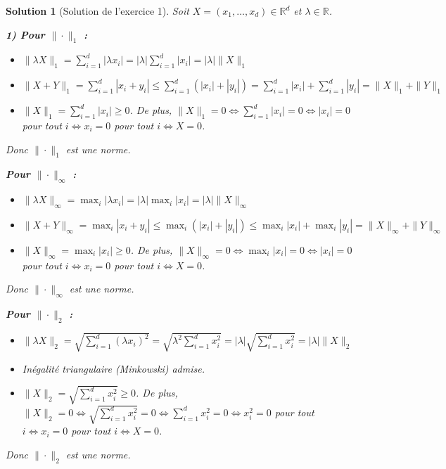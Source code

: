 \documentclass{article}
\newtheorem{solution}{Solution}
\begin{document}
\begin{solution}[Solution de l'exercice 1]
Soit $X = (x_1, \dots, x_d) \in \mathbb{R}^d$ et $\lambda \in \mathbb{R}$.

\textbf{1) Pour $\|\cdot\|_1$ : }
\begin{itemize}
    \item $\|\lambda X\|_1 = \sum_{i=1}^d |\lambda x_i| = |\lambda| \sum_{i=1}^d |x_i| = |\lambda| \|X\|_1$
    \item $\|X + Y\|_1 = \sum_{i=1}^d |x_i + y_i| \leq \sum_{i=1}^d (|x_i| + |y_i|) = \sum_{i=1}^d |x_i| + \sum_{i=1}^d |y_i| = \|X\|_1 + \|Y\|_1$
    \item $\|X\|_1 = \sum_{i=1}^d |x_i| \geq 0$. De plus, $\|X\|_1 = 0 \Leftrightarrow \sum_{i=1}^d |x_i| = 0 \Leftrightarrow |x_i| = 0$ pour tout $i \Leftrightarrow x_i = 0$ pour tout $i \Leftrightarrow X = 0$.
\end{itemize}
Donc $\|\cdot\|_1$ est une norme.

\textbf{Pour $\|\cdot\|_\infty$ : }
\begin{itemize}
    \item $\|\lambda X\|_\infty = \max_{i} |\lambda x_i| = |\lambda| \max_{i} |x_i| = |\lambda| \|X\|_\infty$
    \item $\|X + Y\|_\infty = \max_{i} |x_i + y_i| \leq \max_{i} (|x_i| + |y_i|) \leq \max_{i} |x_i| + \max_{i} |y_i| = \|X\|_\infty + \|Y\|_\infty$
    \item $\|X\|_\infty = \max_{i} |x_i| \geq 0$. De plus, $\|X\|_\infty = 0 \Leftrightarrow \max_{i} |x_i| = 0 \Leftrightarrow |x_i| = 0$ pour tout $i \Leftrightarrow x_i = 0$ pour tout $i \Leftrightarrow X = 0$.
\end{itemize}
Donc $\|\cdot\|_\infty$ est une norme.

\textbf{Pour $\|\cdot\|_2$ : }
\begin{itemize}
    \item $\|\lambda X\|_2 = \sqrt{\sum_{i=1}^d (\lambda x_i)^2} = \sqrt{\lambda^2 \sum_{i=1}^d x_i^2} = |\lambda| \sqrt{\sum_{i=1}^d x_i^2} = |\lambda| \|X\|_2$
    \item Inégalité triangulaire (Minkowski) admise.
    \item $\|X\|_2 = \sqrt{\sum_{i=1}^d x_i^2} \geq 0$. De plus, $\|X\|_2 = 0 \Leftrightarrow \sqrt{\sum_{i=1}^d x_i^2} = 0 \Leftrightarrow \sum_{i=1}^d x_i^2 = 0 \Leftrightarrow x_i^2 = 0$ pour tout $i \Leftrightarrow x_i = 0$ pour tout $i \Leftrightarrow X = 0$.
\end{itemize}
Donc $\|\cdot\|_2$ est une norme.


\end{solution}
\end{document}
